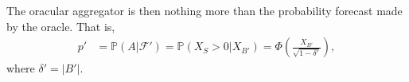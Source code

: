 \documentclass[12pt]{article}
\renewcommand{\P}{\mathbb{P}}
\theoremstyle{definition}
\theoremstyle{definition}
\def\P{{\mathbb P}}
\begin{document}
 The oracular aggregator is then nothing more than the probability forecast made by the oracle. That is,
 \begin{align*}
p' &= \P(A |  \mathcal{F}') = \P(X_S > 0 |  X_{B'}) = \Phi\left( \frac{X_{B'}}{\sqrt{1-\delta'}} \right),
\end{align*}
where $\delta' = |B'|$.
\end{document}

